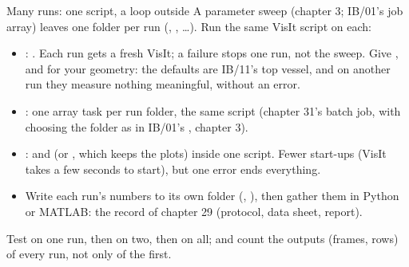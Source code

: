 \documentclass[aspectratio=169,11pt]{beamer}
\begin{document}
\begin{frame}{Many runs: one script, a loop outside}
\label{fr:sweep}
\footnotesize
A parameter sweep (chapter 3; IB/01's job array) leaves one folder per run (, , \dots). Run the same VisIt script on each:
\begin{itemize}\setlength{\itemsep}{1pt}
  \item {}: . Each run gets a fresh VisIt; a failure stops one run, not the sweep. Give ,  and  for your geometry: the defaults are IB/11's top vessel, and on another run they measure nothing meaningful, without an error.
  \item {}: one array task per run folder, the same script (chapter 31's batch job, with  choosing the folder as in IB/01's , chapter 3).
  \item {}:  and  (or , which keeps the plots) inside one script. Fewer start-ups (VisIt takes a few seconds to start), but one error ends everything.
  \item Write each run's numbers to its own folder (, ), then gather them in Python or MATLAB: the record of chapter 29 (protocol, data sheet, report).
\end{itemize}
\begin{punchbox}
\footnotesize Test on one run, then on two, then on all; and count the outputs (frames, rows) of every run, not only of the first.
\end{punchbox}
\end{frame}
\end{document}
